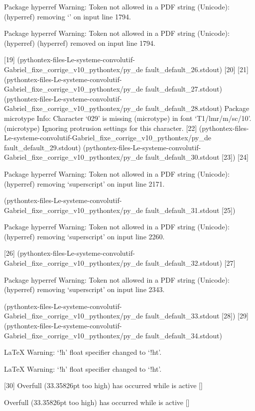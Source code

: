Package hyperref Warning: Token not allowed in a PDF string (Unicode):
(hyperref)                removing `\leavevmode@ifvmode' on input line 1794.


Package hyperref Warning: Token not allowed in a PDF string (Unicode):
(hyperref)                \kern 1.82538pt
(hyperref)                removed on input line 1794.

[19]
(pythontex-files-Le-systeme-convolutif-Gabriel_fixe_corrige_v10_pythontex/py_de
fault_default_26.stdout) [20] [21]
(pythontex-files-Le-systeme-convolutif-Gabriel_fixe_corrige_v10_pythontex/py_de
fault_default_27.stdout)
(pythontex-files-Le-systeme-convolutif-Gabriel_fixe_corrige_v10_pythontex/py_de
fault_default_28.stdout)
Package microtype Info: Character `029' is missing
(microtype)             in font `T1/lmr/m/sc/10'.
(microtype)             Ignoring protrusion settings for this character.
 [22]
(pythontex-files-Le-systeme-convolutif-Gabriel_fixe_corrige_v10_pythontex/py_de
fault_default_29.stdout)
(pythontex-files-Le-systeme-convolutif-Gabriel_fixe_corrige_v10_pythontex/py_de
fault_default_30.stdout [23]) [24]

Package hyperref Warning: Token not allowed in a PDF string (Unicode):
(hyperref)                removing `superscript' on input line 2171.


(pythontex-files-Le-systeme-convolutif-Gabriel_fixe_corrige_v10_pythontex/py_de
fault_default_31.stdout [25])

Package hyperref Warning: Token not allowed in a PDF string (Unicode):
(hyperref)                removing `superscript' on input line 2260.

[26]
(pythontex-files-Le-systeme-convolutif-Gabriel_fixe_corrige_v10_pythontex/py_de
fault_default_32.stdout) [27]

Package hyperref Warning: Token not allowed in a PDF string (Unicode):
(hyperref)                removing `superscript' on input line 2343.


(pythontex-files-Le-systeme-convolutif-Gabriel_fixe_corrige_v10_pythontex/py_de
fault_default_33.stdout [28]) [29]
(pythontex-files-Le-systeme-convolutif-Gabriel_fixe_corrige_v10_pythontex/py_de
fault_default_34.stdout)

LaTeX Warning: `!h' float specifier changed to `!ht'.


LaTeX Warning: `!h' float specifier changed to `!ht'.

[30]
Overfull \vbox (33.35826pt too high) has occurred while \output is active []


Overfull \vbox (33.35826pt too high) has occurred while \output is active []


